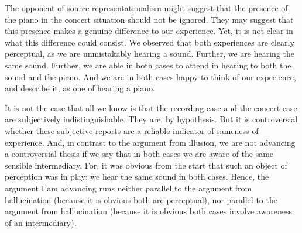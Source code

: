 \documentclass[sloppy, journal, git, bytitle, dodraft]{humapap}
\begin{document}
The opponent of source-representationalism might suggest that the presence of the piano in the concert situation should not be ignored. They may suggest that this presence makes a genuine difference to our experience. Yet, it is not clear in what this difference could consist. We observed that both experiences are clearly perceptual, as we are unmistakably hearing a sound. Further, we are hearing the same sound. Further, we are able in both cases to attend in hearing to both the sound and the piano. And we are in both cases happy to think of our experience, and describe it, as one of hearing a piano. 

It is not the case that all we know is that the recording case and the concert case are subjectively indistinguishable. They are, by hypothesis. But it is controversial whether these subjective reports are a reliable indicator of sameness of experience. And, in contrast to the argument from illusion, we are not advancing a controversial thesis if we say that in both cases we are aware of the same sensible intermediary. For, it was obvious from the start that such an object of perception was in play: we hear the same sound in both cases. Hence, the argument I am advancing runs neither parallel to the argument from hallucination (because it is obvious both are perceptual), nor parallel to the argument from hallucination (because it is obvious both cases involve awareness of an intermediary). 

\end{document}
